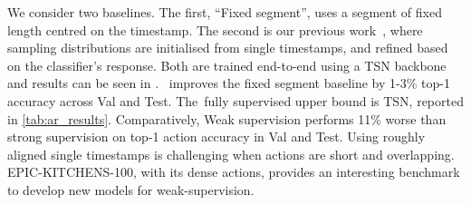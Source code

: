 \RequirePackage{amsmath} \documentclass[runningheads]{llncs}
\newcommand{\chParagraph}[1]{\noindent {\textbf{#1.}} \hspace{6pt}}
\newcommand {\newDataset} {EPIC-KITCHENS-100}
\begin{document}
\chParagraph{Baselines and Results} 
We consider two baselines. 
The first, ``Fixed segment'', uses a segment of fixed length centred on the timestamp. 
The second is our previous work~\cite{Moltisanti_2019_CVPR}, where sampling distributions are initialised from single timestamps, and refined based on the classifier's response.
Both are trained end-to-end using a TSN backbone~\cite{wang2016tsn} and results can be seen in . \cite{Moltisanti_2019_CVPR}~improves the fixed segment baseline by 1-3\% top-1 accuracy across Val and Test. The~fully supervised upper bound is TSN, reported in \cref{tab:ar_results}. Comparatively, Weak supervision performs 11\% worse than strong supervision on top-1 action accuracy in Val and Test. 
Using roughly aligned single timestamps is
challenging when actions are short and overlapping. 
\newDataset, with its dense actions, provides an interesting benchmark to develop new models for weak-supervision.


\begin{table}[t!]
	\caption{Temporal action detection results in mAP (\%).}
\label{tab:tad_results}

\end{table}
\end{document}
